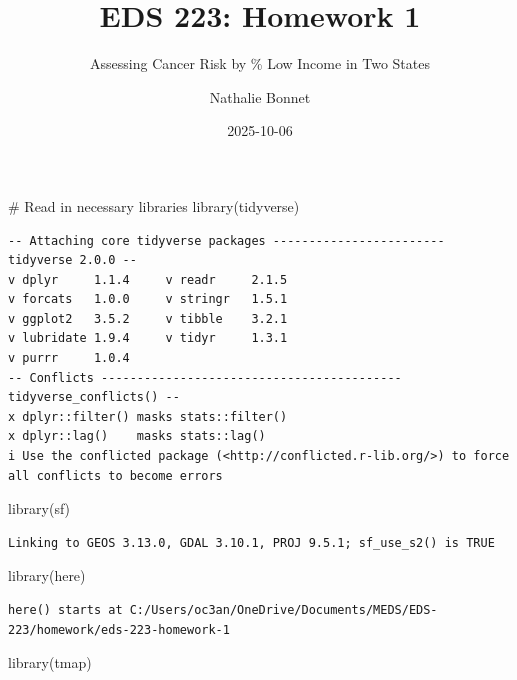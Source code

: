 \documentclass[
  letterpaper,
  DIV=11,
  numbers=noendperiod]{scrartcl}
\title{EDS 223: Homework 1}
\subtitle{Assessing Cancer Risk by \% Low Income in Two States}
\author{Nathalie Bonnet}
\date{2025-10-06}
\newenvironment{Shaded}{\begin{snugshade}}{\end{snugshade}}
\newcommand{\CommentTok}[1]{\textcolor[rgb]{0.37,0.37,0.37}{#1}}
\newcommand{\FunctionTok}[1]{\textcolor[rgb]{0.28,0.35,0.67}{#1}}
\newcommand{\NormalTok}[1]{\textcolor[rgb]{0.00,0.23,0.31}{#1}}
\renewcommand*\contentsname{Table of contents}
\newcommand\contentsname{Table of contents}
\begin{document}
\maketitle

\renewcommand*\contentsname{Table of contents}
{
\hypersetup{linkcolor=}
\setcounter{tocdepth}{3}
\tableofcontents
}

\begin{Shaded}
\begin{Highlighting}[]
\CommentTok{\# Read in necessary libraries}
\FunctionTok{library}\NormalTok{(tidyverse)}
\end{Highlighting}
\end{Shaded}

\begin{verbatim}
-- Attaching core tidyverse packages ------------------------ tidyverse 2.0.0 --
v dplyr     1.1.4     v readr     2.1.5
v forcats   1.0.0     v stringr   1.5.1
v ggplot2   3.5.2     v tibble    3.2.1
v lubridate 1.9.4     v tidyr     1.3.1
v purrr     1.0.4     
-- Conflicts ------------------------------------------ tidyverse_conflicts() --
x dplyr::filter() masks stats::filter()
x dplyr::lag()    masks stats::lag()
i Use the conflicted package (<http://conflicted.r-lib.org/>) to force all conflicts to become errors
\end{verbatim}

\begin{Shaded}
\begin{Highlighting}[]
\FunctionTok{library}\NormalTok{(sf)}
\end{Highlighting}
\end{Shaded}

\begin{verbatim}
Linking to GEOS 3.13.0, GDAL 3.10.1, PROJ 9.5.1; sf_use_s2() is TRUE
\end{verbatim}

\begin{Shaded}
\begin{Highlighting}[]
\FunctionTok{library}\NormalTok{(here)}
\end{Highlighting}
\end{Shaded}

\begin{verbatim}
here() starts at C:/Users/oc3an/OneDrive/Documents/MEDS/EDS-223/homework/eds-223-homework-1
\end{verbatim}

\begin{Shaded}
\begin{Highlighting}[]
\FunctionTok{library}\NormalTok{(tmap)}
\end{Highlighting}
\end{Shaded}
\end{document}
